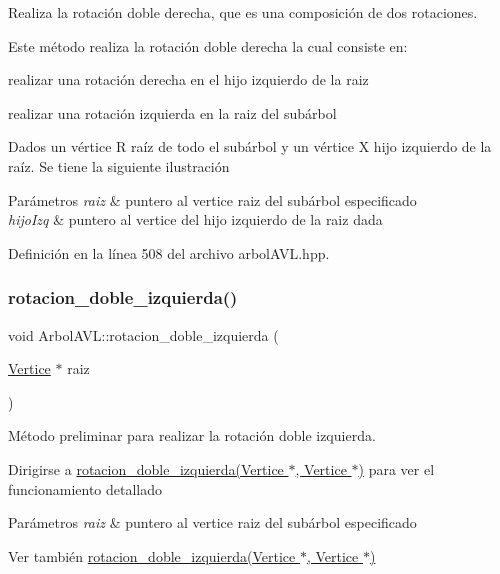 Realiza la rotación doble derecha, que es una composición de dos rotaciones. 

Este método realiza la rotación doble derecha la cual consiste en\+:
\begin{DoxyItemize}
\item realizar una rotación derecha en el hijo izquierdo de la raiz
\item realizar una rotación izquierda en la raiz del subárbol
\end{DoxyItemize}

Dados un vértice R raíz de todo el subárbol y un vértice X hijo izquierdo de la raíz. Se tiene la siguiente ilustración ~\newline
  
\begin{DoxyParams}{Parámetros}
{\em raiz} & puntero al vertice raiz del subárbol especificado \\
\hline
{\em hijo\+Izq} & puntero al vertice del hijo izquierdo de la raiz dada \\
\hline
\end{DoxyParams}


Definición en la línea 508 del archivo arbol\+A\+V\+L.\+hpp.

\mbox{\label{classArbolAVL_a0b4342509dd935785b6f54924e06afea}} 
\subsubsection{\texorpdfstring{rotacion\+\_\+doble\+\_\+izquierda()}{rotacion\_doble\_izquierda()}\hspace{0.1cm}{\footnotesize\ttfamily [1/2]}}
{\footnotesize\ttfamily void Arbol\+A\+V\+L\+::rotacion\+\_\+doble\+\_\+izquierda (\begin{DoxyParamCaption}\item[{\hyperlink{classVertice}{Vertice} $\ast$}]{raiz }\end{DoxyParamCaption})}



Método preliminar para realizar la rotación doble izquierda. 

Dirigirse a \hyperlink{classArbolAVL_a3115c59bd2be761c530eeeb11a169700}{rotacion\+\_\+doble\+\_\+izquierda(\+Vertice $\ast$, Vertice $\ast$)} para ver el funcionamiento detallado 
\begin{DoxyParams}{Parámetros}
{\em raiz} & puntero al vertice raiz del subárbol especificado \\
\hline
\end{DoxyParams}
\begin{DoxySeeAlso}{Ver también}
\hyperlink{classArbolAVL_a3115c59bd2be761c530eeeb11a169700}{rotacion\+\_\+doble\+\_\+izquierda(\+Vertice $\ast$, Vertice $\ast$)} 
\end{DoxySeeAlso}


